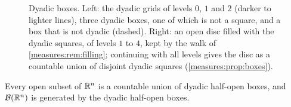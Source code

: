 \begin{notechapter}
\begin{figure}[ht]
\caption{Dyadic boxes. Left: the dyadic grids of levels $0$, $1$ and
$2$ (darker to lighter lines), three dyadic boxes, one of which is not a
square, and a box that is not dyadic (dashed). Right: an open disc
filled with the dyadic squares, of levels $1$ to $4$, kept by the walk
of \cref{measures:rem:filling}; continuing with all levels gives the
disc as a countable union of disjoint dyadic squares
(\cref{measures:prop:boxes}).}
\label{measures:fig:dyadic}
\end{figure}

\begin{proposition}\label{measures:prop:boxes}
Every open subset of $\mathbb{R}^n$ is a countable union of dyadic half-open
boxes, and $\mathcal B(\mathbb{R}^n)$ is generated by the dyadic half-open boxes.
\end{proposition}


\end{notechapter}
